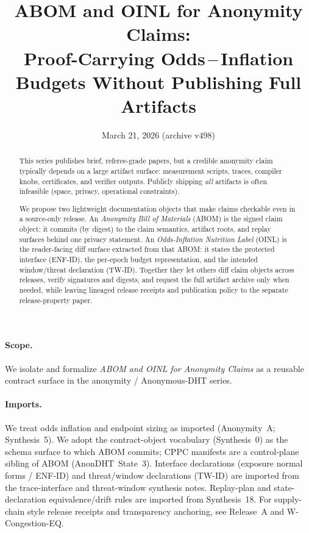 \documentclass[11pt]{article}
\title{ABOM and OINL for Anonymity Claims:\\
Proof-Carrying Odds\,--\,Inflation Budgets Without Publishing Full Artifacts}
\author{}
\date{March 21, 2026 (archive v498)}
\begin{document}
\maketitle

\begin{abstract}
This series publishes brief, referee-grade papers, but a credible anonymity claim typically depends on a large artifact surface: measurement scripts, traces, compiler knobs, certificates, and verifier outputs.
Publicly shipping \emph{all} artifacts is often infeasible (space, privacy, operational constraints).

We propose two lightweight documentation objects that make claims checkable even in a source-only release.
An \emph{Anonymity Bill of Materials} (ABOM) is the signed claim object: it commits (by digest) to the claim semantics, artifact roots, and replay surfaces behind one privacy statement.
An \emph{Odds-Inflation Nutrition Label} (OINL) is the reader-facing diff surface extracted from that ABOM: it states the protected interface (ENF-ID), the per-epoch budget representation, and the intended window/threat declaration (TW-ID).
Together they let others diff claim objects across releases, verify signatures and digests, and request the full artifact archive only when needed, while leaving lineaged release receipts and publication policy to the separate release-property paper.
\end{abstract}

\paragraph{Scope.}
We isolate and formalize \emph{ABOM and OINL for Anonymity Claims} as a reusable contract surface in the anonymity / Anonymous-DHT series.

\paragraph{Imports.}
We treat odds inflation and endpoint sizing as imported (Anonymity~A; Synthesis~5).\cite{series:oddsinflation,series:endpointbridge}
We adopt the contract-object vocabulary (Synthesis~0) as the schema surface to which ABOM commits; CPPC manifests are a control-plane sibling of ABOM (AnonDHT~State~3).\cite{series:contractobjects,series:state3}
Interface declarations (exposure normal forms / ENF-ID) and threat/window declarations (TW-ID) are imported from the trace-interface and threat-window synthesis notes.\cite{series:traceifaces,series:threatwindows}
Replay-plan and state-declaration equivalence/drift rules are imported from Synthesis~18.\cite{series:planstateequiv}
For supply-chain style release receipts and transparency anchoring, see Release~A and W-Congestion-EQ.\cite{series:releaseproperty,series:wcongeq}
\end{document}

